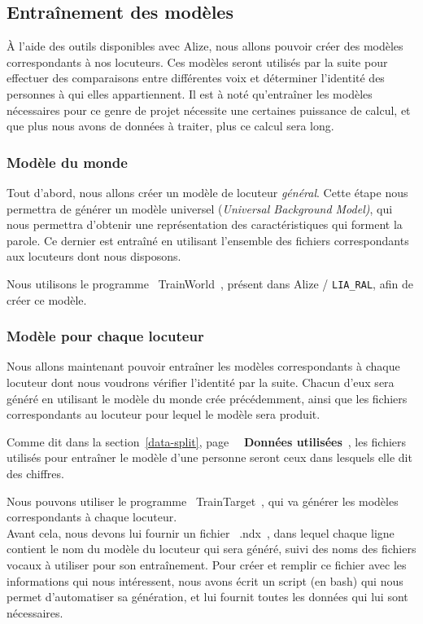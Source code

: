 \documentclass[a4paper, 12pt]{book}
\newcounter{program}[subsection]
\begin{document}
\subsection{Entraînement des modèles}

À l'aide des outils disponibles avec Alize, nous allons pouvoir créer des modèles correspondants à nos locuteurs. Ces modèles seront utilisés par la suite pour effectuer des comparaisons entre différentes voix et déterminer l'identité des personnes à qui elles appartiennent. Il est à noté qu'entraîner les modèles nécessaires pour ce genre de projet nécessite une certaines puissance de calcul, et que plus nous avons de données à traiter, plus ce calcul sera long.

\subsubsection{Modèle du monde}

Tout d'abord, nous allons créer un modèle de locuteur \textit{général}. Cette étape nous permettra de générer un modèle universel (\textit{Universal Background Model)}, qui nous permettra d'obtenir une représentation des caractéristiques qui forment la parole. Ce dernier est entraîné en utilisant l'ensemble des fichiers correspondants aux locuteurs dont nous disposons. 

Nous utilisons le programme \guillemotleft{}~TrainWorld~\guillemotright{}, présent dans Alize / \texttt{LIA\_RAL}, afin de créer ce modèle.

\subsubsection{Modèle pour chaque locuteur}

Nous allons maintenant pouvoir entraîner les modèles correspondants à chaque locuteur dont nous voudrons vérifier l'identité par la suite.
Chacun d'eux sera généré en utilisant le modèle du monde crée précédemment, ainsi que les fichiers correspondants au locuteur pour lequel le modèle sera produit.

Comme dit dans la section~\ref{data-split}, page~\pageref{data-split} \guillemotleft{}~\textbf{Données utilisées}~\guillemotright{}, les fichiers utilisés pour entraîner le modèle d'une personne seront ceux dans lesquels elle dit des chiffres.

Nous pouvons utiliser le programme \guillemotleft{}~TrainTarget~\guillemotright{}, qui va générer les modèles correspondants à chaque locuteur.\\
Avant cela, nous devons lui fournir un fichier \guillemotleft{}~.ndx~\guillemotright{}, dans lequel chaque ligne contient le nom du modèle du locuteur qui sera généré, suivi des noms des fichiers vocaux à utiliser pour son entraînement. Pour créer et remplir ce fichier avec les informations qui nous intéressent, nous avons écrit un script (en bash) qui nous permet d'automatiser sa génération, et lui fournit toutes les données qui lui sont nécessaires.
\end{document}
